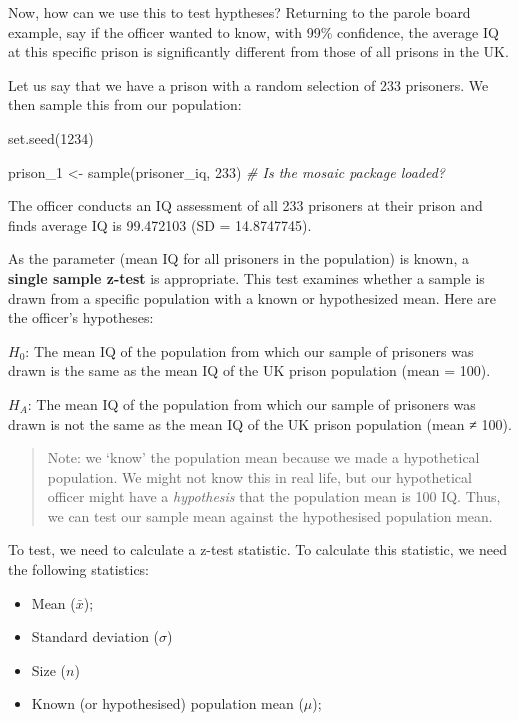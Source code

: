 \documentclass[
]{book}
\newenvironment{Shaded}{\begin{snugshade}}{\end{snugshade}}
\newcommand{\CommentTok}[1]{\textcolor[rgb]{0.56,0.35,0.01}{\textit{#1}}}
\newcommand{\DecValTok}[1]{\textcolor[rgb]{0.00,0.00,0.81}{#1}}
\newcommand{\FunctionTok}[1]{\textcolor[rgb]{0.00,0.00,0.00}{#1}}
\newcommand{\NormalTok}[1]{#1}
\newcommand{\OtherTok}[1]{\textcolor[rgb]{0.56,0.35,0.01}{#1}}
\providecommand{\tightlist}{%
  \setlength{\itemsep}{0pt}\setlength{\parskip}{0pt}}
\begin{document}
Now, how can we use this to test hyptheses? Returning to the parole board example, say if the officer wanted to know, with 99\% confidence, the average IQ at this specific prison is significantly different from those of all prisons in the UK.

Let us say that we have a prison with a random selection of 233 prisoners. We then sample this from our population:

\begin{Shaded}
\begin{Highlighting}[]
\FunctionTok{set.seed}\NormalTok{(}\DecValTok{1234}\NormalTok{)}

\NormalTok{prison\_1 }\OtherTok{\textless{}{-}} \FunctionTok{sample}\NormalTok{(prisoner\_iq, }\DecValTok{233}\NormalTok{) }\CommentTok{\# Is the \textquotesingle{}mosaic\textquotesingle{} package loaded?}
\end{Highlighting}
\end{Shaded}

The officer conducts an IQ assessment of all 233 prisoners at their prison and finds average IQ is 99.472103 (SD = 14.8747745).

As the parameter (mean IQ for all prisoners in the population) is known, a \textbf{single sample z-test} is appropriate. This test examines whether a sample is drawn from a specific population with a known or hypothesized mean. Here are the officer's hypotheses:

\(H_0\): The mean IQ of the population from which our sample of prisoners was drawn is the same as the mean IQ of the UK prison population (mean = 100).

\(H_A\): The mean IQ of the population from which our sample of prisoners was drawn is not the same as the mean IQ of the UK prison population (mean ≠ 100).

\begin{quote}
Note: we `know' the population mean because we made a hypothetical population. We might not know this in real life, but our hypothetical officer might have a \emph{hypothesis} that the population mean is 100 IQ. Thus, we can test our sample mean against the hypothesised population mean.
\end{quote}

To test, we need to calculate a z-test statistic. To calculate this statistic, we need the following statistics:

\begin{itemize}
\tightlist
\item
  Mean (\(\bar{x}\));
\item
  Standard deviation (\(\sigma\))
\item
  Size (\(n\))
\item
  Known (or hypothesised) population mean (\(\mu\));
\end{itemize}
\end{document}
